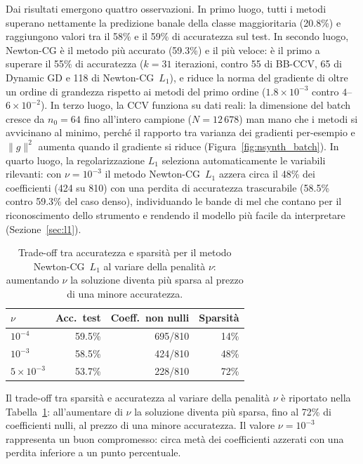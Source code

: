 \documentclass[italian, a4paper, twoside, binding=6mm]{sapthesis}
\begin{document}
Dai risultati emergono quattro osservazioni. In primo luogo, tutti i metodi
superano nettamente la predizione banale della classe maggioritaria (20.8\%)
e raggiungono valori tra il 58\% e il 59\% di accuratezza sul test. In
secondo luogo, Newton-CG è il metodo più accurato (59.3\%) e il più veloce:
è il primo a superare il 55\% di accuratezza ($k = 31$ iterazioni, contro 55
di BB-CCV, 65 di Dynamic GD e 118 di Newton-CG~$L_1$), e riduce la norma del
gradiente di oltre un ordine di grandezza rispetto ai metodi del primo ordine
($1.8\times10^{-3}$ contro $4$--$6\times10^{-2}$). In terzo luogo, la
CCV funziona su dati reali: la dimensione del batch cresce da $n_0 = 64$
fino all'intero campione ($N = 12\,678$) man mano che i metodi si avvicinano
al minimo, perché il rapporto tra varianza dei gradienti per-esempio e
$\|g\|^2$ aumenta quando il gradiente si riduce
(Figura~\ref{fig:nsynth_batch}). In quarto luogo, la regolarizzazione $L_1$
seleziona automaticamente le variabili rilevanti: con $\nu = 10^{-3}$ il
metodo Newton-CG~$L_1$ azzera circa il 48\% dei coefficienti (424 su 810)
con una perdita di accuratezza trascurabile (58.5\% contro 59.3\% del caso
denso), individuando le bande di mel che contano per il riconoscimento dello
strumento e rendendo il modello più facile da interpretare
(Sezione~\ref{sec:l1}).

\begin{table}[H]
\centering
\small
\renewcommand{\arraystretch}{1.3}
\begin{tabular}{l r r r}
\toprule
$\nu$ & Acc.\ test & Coeff.\ non nulli & Sparsità \\
\midrule
$10^{-4}$      & 59.5\% & 695/810 & 14\% \\
$10^{-3}$      & 58.5\% & 424/810 & 48\% \\
$5\times10^{-3}$ & 53.7\% & 228/810 & 72\% \\
\bottomrule
\end{tabular}
\caption{Trade-off tra accuratezza e sparsità per il metodo Newton-CG~$L_1$
al variare della penalità $\nu$: aumentando $\nu$ la soluzione diventa più
sparsa al prezzo di una minore accuratezza.}
\label{tab:nsynth_l1}
\end{table}

Il trade-off tra sparsità e accuratezza al variare della penalità $\nu$ è
riportato nella Tabella~\ref{tab:nsynth_l1}: all'aumentare di $\nu$ la
soluzione diventa più sparsa, fino al 72\% di coefficienti nulli, al prezzo
di una minore accuratezza. Il valore $\nu = 10^{-3}$ rappresenta un buon
compromesso: circa metà dei coefficienti azzerati con una perdita inferiore
a un punto percentuale.
\end{document}
